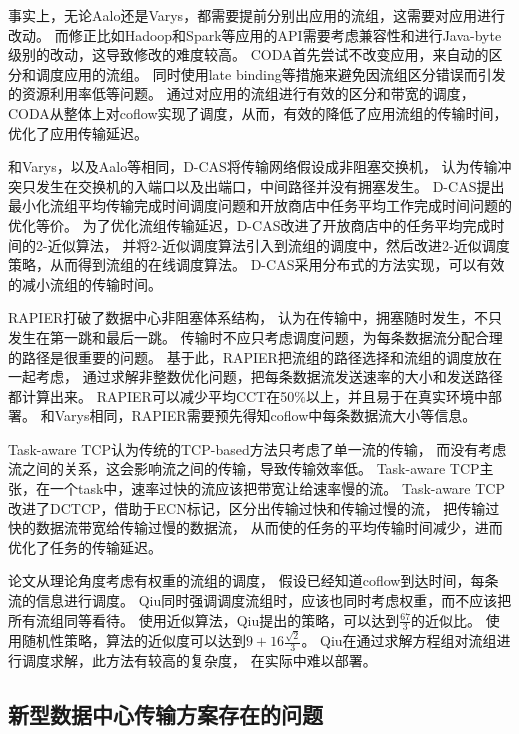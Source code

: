 事实上，无论Aalo还是Varys，都需要提前分别出应用的流组，这需要对应用进行改动。
而修正比如Hadoop和Spark等应用的API需要考虑兼容性和进行Java-byte级别的改动，这导致修改的难度较高。
CODA\cite{zhang2016coda}首先尝试不改变应用，来自动的区分和调度应用的流组。
同时使用late binding等措施来避免因流组区分错误而引发的资源利用率低等问题。
通过对应用的流组进行有效的区分和带宽的调度，
CODA从整体上对coflow实现了调度，从而，有效的降低了应用流组的传输时间，优化了应用传输延迟。


和Varys，以及Aalo等相同，D-CAS\cite{luo2016towards}将传输网络假设成非阻塞交换机，
认为传输冲突只发生在交换机的入端口以及出端口，中间路径并没有拥塞发生。
D-CAS提出最小化流组平均传输完成时间调度问题和开放商店中任务平均工作完成时间问题的优化等价。
为了优化流组传输延迟，D-CAS改进了开放商店中的任务平均完成时间的2-近似算法\cite{roemer2006note}，
并将2-近似调度算法引入到流组的调度中，然后改进2-近似调度策略，从而得到流组的在线调度算法。
D-CAS采用分布式的方法实现，可以有效的减小流组的传输时间。



RAPIER\cite{zhao2015rapier}打破了数据中心非阻塞体系结构，
认为在传输中，拥塞随时发生，不只发生在第一跳和最后一跳。
传输时不应只考虑调度问题，为每条数据流分配合理的路径是很重要的问题。
基于此，RAPIER把流组的路径选择和流组的调度放在一起考虑，
通过求解非整数优化问题，把每条数据流发送速率的大小和发送路径都计算出来。
RAPIER可以减少平均CCT在50$\%$以上，并且易于在真实环境中部署。
和Varys相同，RAPIER需要预先得知coflow中每条数据流大小等信息。


Task-aware TCP\cite{liu2017task}认为传统的TCP-based方法只考虑了单一流的传输，
而没有考虑流之间的关系，这会影响流之间的传输，导致传输效率低。
Task-aware TCP主张，在一个task中，速率过快的流应该把带宽让给速率慢的流。
Task-aware TCP\cite{liu2017task}改进了DCTCP，借助于ECN标记，区分出传输过快和传输过慢的流，
把传输过快的数据流带宽给传输过慢的数据流，
从而使的任务的平均传输时间减少，进而优化了任务的传输延迟。




论文从理论角度考虑有权重的流组的调度，
假设已经知道coflow到达时间，每条流的信息进行调度。
Qiu同时强调调度流组时，应该也同时考虑权重，而不应该把所有流组同等看待。
使用近似算法，Qiu提出的策略，可以达到$\frac{67}{3}$的近似比。
使用随机性策略，算法的近似度可以达到$9+16\frac{\sqrt{2}}{3}$。
Qiu在通过求解方程组对流组进行调度求解，此方法有较高的复杂度，
在实际中难以部署。




\subsection{新型数据中心传输方案存在的问题}

